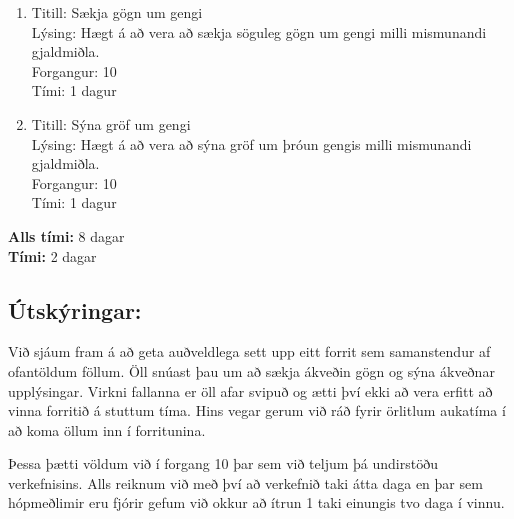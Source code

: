 \documentclass[a4,12pt]{article}
\begin{document}
\begin{enumerate}[]
\item Titill: Sækja gögn um gengi\\
Lýsing: Hægt á að vera að sækja söguleg gögn um gengi milli mismunandi gjaldmiðla.\\
Forgangur: 10\\
Tími: 1 dagur

\item Titill: Sýna gröf um gengi\\
Lýsing: Hægt á að vera að sýna gröf um þróun gengis milli mismunandi gjaldmiðla.\\
Forgangur: 10\\
Tími: 1 dagur
\end{enumerate}
\textbf{Alls tími:} 8 dagar\\
\textbf{Tími:} 2 dagar

\subsection{Útskýringar:} Við sjáum fram á að geta auðveldlega sett upp eitt forrit sem samanstendur af ofantöldum föllum. Öll snúast þau um að sækja ákveðin gögn og sýna ákveðnar upplýsingar. Virkni fallanna er öll afar svipuð og ætti því ekki að vera erfitt að vinna forritið á stuttum tíma. Hins vegar gerum við ráð fyrir örlitlum aukatíma í að koma öllum inn í forritunina. 

Þessa þætti völdum við í forgang 10 þar sem við teljum þá undirstöðu verkefnisins. Alls reiknum við með því að verkefnið taki átta daga en þar sem hópmeðlimir eru fjórir gefum við okkur að ítrun 1 taki einungis tvo daga í vinnu.
\end{document}
